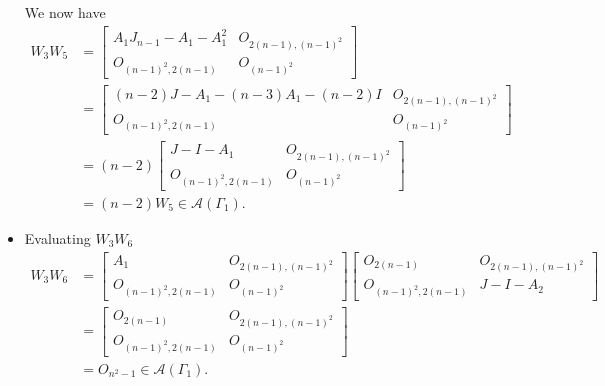 \begin{itemize}
    We now have 
    \begin{align*}
        W_3W_5
        &=\begin{bmatrix}
            A_1J_{n-1} - A_1 - A_1^2 & O_{2(n-1), (n-1)^2} \\
            O_{(n-1)^2, 2(n-1)} & O_{(n-1)^2}
        \end{bmatrix} \\
        &= \begin{bmatrix}
            (n-2)J - A_1 -(n-3)A_1 - (n-2)I & O_{2(n-1), (n-1)^2} \\
            O_{(n-1)^2, 2(n-1)} & O_{(n-1)^2}
        \end{bmatrix} \\
        &= (n-2)\begin{bmatrix}
            J - I - A_1& O_{2(n-1), (n-1)^2} \\
            O_{(n-1)^2, 2(n-1)} & O_{(n-1)^2}
        \end{bmatrix}\\
        &= (n-2)W_5 \in\mathcal{A}(\Gamma_1).
    \end{align*}

    
    
    \item Evaluating $W_3W_6$
    \begin{align*}
        W_3W_6
        &=
        \begin{bmatrix}
            A_1 & O_{2(n-1), (n-1)^2} \\
            O_{(n-1)^2, 2(n-1)} & O_{(n-1)^2}
        \end{bmatrix}\begin{bmatrix}
            O_{2(n-1)} & O_{2(n-1), (n-1)^2} \\
            O_{(n-1)^2, 2(n-1)} & J-I-A_2
        \end{bmatrix} \\
        &= \begin{bmatrix}
            O_{2(n-1)} & O_{2(n-1), (n-1)^2} \\
            O_{(n-1)^2, 2(n-1)} & O_{(n-1)^2}
        \end{bmatrix} \\
        &= O_{n^2-1} \in \mathcal{A}(\Gamma_1).
    \end{align*}
    

\end{itemize}
